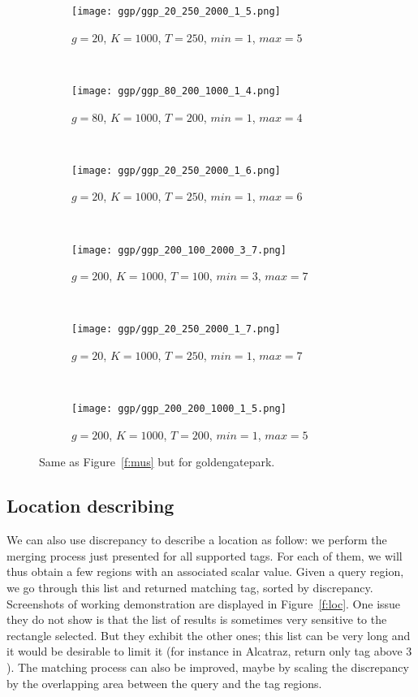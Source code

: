 \begin{figure}
        \centering
        \begin{subfigure}[b]{0.5\textwidth}
                \texttt{[image: ggp/ggp\_20\_250\_2000\_1\_5.png]}
                \caption{$g=20$, $K=1000$, $T=250$, $min=1$, $max=5$}
        \end{subfigure}~
        \begin{subfigure}[b]{0.5\textwidth}
                \texttt{[image: ggp/ggp\_80\_200\_1000\_1\_4.png]}
                \caption{$g=80$, $K=1000$, $T=200$, $min=1$, $max=4$}
        \end{subfigure}~

        \begin{subfigure}[b]{0.5\textwidth}
                \texttt{[image: ggp/ggp\_20\_250\_2000\_1\_6.png]}
                \caption{$g=20$, $K=1000$, $T=250$, $min=1$, $max=6$}
        \end{subfigure}~
        \begin{subfigure}[b]{0.5\textwidth}
                \texttt{[image: ggp/ggp\_200\_100\_2000\_3\_7.png]}
                \caption{$g=200$, $K=1000$, $T=100$, $min=3$, $max=7$}
        \end{subfigure}~

        \begin{subfigure}[b]{0.5\textwidth}
                \texttt{[image: ggp/ggp\_20\_250\_2000\_1\_7.png]}
                \caption{$g=20$, $K=1000$, $T=250$, $min=1$, $max=7$}
        \end{subfigure}~
        \begin{subfigure}[b]{0.5\textwidth}
                \texttt{[image: ggp/ggp\_200\_200\_1000\_1\_5.png]}
                \caption{$g=200$, $K=1000$, $T=200$, $min=1$, $max=5$}
        \end{subfigure}
		\caption{Same as Figure~\ref{f:mus} but for
		\textsf{goldengatepark}.\label{f:ggp}}
\end{figure}

\subsection{Location describing}

We can also use discrepancy to describe a location as follow: we perform the
merging process just presented for all supported tags. For each of them, we will
thus obtain a few regions with an associated scalar value. Given a query
region, we go through this list and returned matching tag, sorted by
discrepancy. Screenshots of working demonstration are displayed in
Figure~\vref{f:loc}. One issue they do not show is that the list of results
is sometimes very sensitive to the rectangle selected. But they exhibit the
other ones; this list can be very long and it would be desirable to limit it
(for instance in Alcatraz, return only tag above $3$). The matching process
can also be improved, maybe by scaling the discrepancy by the overlapping
area between the query and the tag regions.

